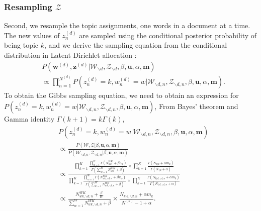 \documentclass[a4paper]{article}
\begin{document}
   \subsubsection{Resampling $\mathcal{Z}$}  \label{subsec: Resampling Z}
   
   Second, we resample the topic assignments, one words in a document at a time.  The new values of $z^{(d)}_n$ are sampled using the conditional posterior probability of being topic $k$, and we derive the sampling equation from the conditional distribution in Latent Dirichlet allocation \citep{Blei2003}:
     \begin{equation}
     \begin{aligned}
     & P(\boldsymbol{w}^{(d)}, \boldsymbol{z}^{(d)}|\mathcal{W}_{\backslash d}, \mathcal{Z}_{\backslash d}, \beta, \boldsymbol{u}, \alpha, \boldsymbol{m}) \\& \propto \prod_{n=1}^{N^{(d)}}P(z^{(d)}_n=k, w^{(d)}_n=w| \mathcal{W}_{\backslash d, n}, \mathcal{Z}_{\backslash d, n}, \beta, \boldsymbol{u}, \alpha, \boldsymbol{m}).
     \end{aligned}
     \end{equation} 
     To obtain the Gibbs sampling equation, we need to obtain an expression for $P(z^{(d)}_n=k,  w^{(d)}_n=w|\mathcal{W}_{\backslash d, n}, \mathcal{Z}_{\backslash d, n}, \beta, \boldsymbol{u}, \alpha, \boldsymbol{m})$,
     From Bayes' theorem and Gamma identity $\Gamma(k+1)=k\Gamma(k)$,
     \begin{equation}
     \begin{aligned}
     & P(z^{(d)}_n=k, w^{(d)}_n=w|\mathcal{W}_{\backslash d, n}, \mathcal{Z}_{\backslash d, n}, \beta, \boldsymbol{u}, \alpha, \boldsymbol{m}) \\& \propto 
     \frac{P(\mathcal{W}, \mathcal{Z}|\beta, \boldsymbol{u}, \alpha, \boldsymbol{m})}{P(\mathcal{W}_{\backslash d, n}, \mathcal{Z}_{\backslash d, n}|\beta, \boldsymbol{u}, \alpha, \boldsymbol{m})}\\& \propto \frac{\prod_{k=1}^{K}\frac{\prod_{w=1}^W\Gamma(N_{wk}^{WK}+\beta u_w)}{\Gamma(\sum_{w=1}^WN_{wk}^{WK}+\beta )}\times\prod_{k=1}^K\frac{\Gamma(N_{k|d}+\alpha m_k)}{\Gamma(N_{\cdot|d}+\alpha)}}{\prod_{k=1}^{K}\frac{\prod_{w=1}^W\Gamma(N_{wk, \backslash d, n}^{WK}+\beta u_w)}{\Gamma(\sum_{w=1}^WN_{wk, \backslash d, n}^{WK}+\beta )}\times\prod_{k=1}^K\frac{\Gamma(N_{k|d, \backslash d, n}+\alpha m_k)}{\Gamma(N_{\cdot|d, \backslash d, n}+\alpha)}}\\ & \propto 
     \frac{N_{wk, \backslash d, n}^{WK}+\frac{\beta}{W}}{\sum_{w=1}^WN_{wk,  \backslash d, n}^{WK}+\beta}\times\frac{N_{k|d, \backslash d, n}+\alpha m_k}{N^{(d)}-1+\alpha}.
     \end{aligned}
     \end{equation}
\end{document}
